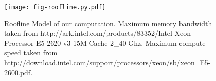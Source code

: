 \begin{figure}[h]

  \centering
  \texttt{[image: fig-roofline.py.pdf]}

  \caption{Roofline Model of our computation. Maximum memory bandwidth taken from http://ark.intel.com/products/83352/Intel-Xeon-Processor-E5-2620-v3-15M-Cache-2\_40-Ghz.  Maximum compute speed taken from http://download.intel.com/support/processors/xeon/sb/xeon\_E5-2600.pdf.}

  \label{fig-roofline}

\end{figure}